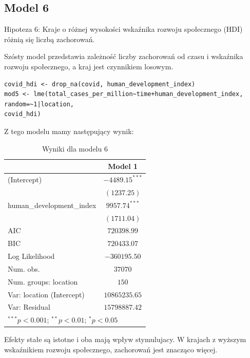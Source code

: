 \documentclass[12pt]{mwbk}
\theoremstyle{plain}
\theoremstyle{definition}
\theoremstyle{remark}
\begin{document}
\subsection{Model 6}

Hipoteza 6: Kraje o różnej wysokości wskaźnika rozwoju społecznego (HDI) różnią się liczbą zachorowań.

Szósty model przedstawia zależność liczby zachorowań od czasu i wskaźnika rozwoju społecznego, a kraj jest czynnikiem losowym.

\begin{verbatim}
covid_hdi <- drop_na(covid, human_development_index)
mod5 <- lme(total_cases_per_million~time+human_development_index,
random=~1|location,
covid_hdi)
\end{verbatim}

Z tego modelu mamy następujący wynik:

\begin{table}
	\begin{center}
		\begin{tabular}{l c}
			\hline
			& Model 1 \\
			\hline
			(Intercept)               & $-4489.15^{***}$ \\
			& $(1237.25)$      \\
			human\_development\_index & $9957.74^{***}$  \\
			& $(1711.04)$      \\
			\hline
			AIC                       & $720398.99$      \\
			BIC                       & $720433.07$      \\
			Log Likelihood            & $-360195.50$     \\
			Num. obs.                 & $37070$          \\
			Num. groups: location     & $150$            \\
			Var: location (Intercept) & $10865235.65$    \\
			Var: Residual             & $15798887.42$    \\
			\hline
			\multicolumn{2}{l}{\scriptsize{$^{***}p<0.001$; $^{**}p<0.01$; $^{*}p<0.05$}}
		\end{tabular}
		\caption{Wyniki dla modelu 6}
		\label{table:model6}
	\end{center}
\end{table}

 Efekty stałe są istotne i oba mają wpływ stymulujacy. W krajach z wyższym wskaźnikiem rozwoju społecznego, zachorowań jest znacząco więcej.
\end{document}
